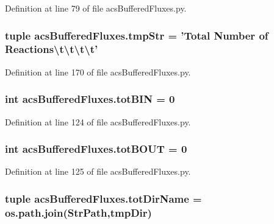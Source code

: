 Definition at line 79 of file acs\-Buffered\-Fluxes.\-py.

\hypertarget{a00098_a5b34c38ff1251831412c297823a2a945}{
\subsubsection[{tmp\-Str}]{\setlength{\rightskip}{0pt plus 5cm}tuple acs\-Buffered\-Fluxes.\-tmp\-Str = 'Total Number of Reactions\textbackslash{}t\textbackslash{}t\textbackslash{}t\textbackslash{}t'}}\label{a00098_a5b34c38ff1251831412c297823a2a945}


Definition at line 170 of file acs\-Buffered\-Fluxes.\-py.

\hypertarget{a00098_ae057f24c5c495bb01544251db7e74ad9}{
\subsubsection[{tot\-B\-I\-N}]{\setlength{\rightskip}{0pt plus 5cm}int acs\-Buffered\-Fluxes.\-tot\-B\-I\-N = 0}}\label{a00098_ae057f24c5c495bb01544251db7e74ad9}


Definition at line 124 of file acs\-Buffered\-Fluxes.\-py.

\hypertarget{a00098_a3da6f0cfe81256d19a801c63ccbe0c96}{
\subsubsection[{tot\-B\-O\-U\-T}]{\setlength{\rightskip}{0pt plus 5cm}int acs\-Buffered\-Fluxes.\-tot\-B\-O\-U\-T = 0}}\label{a00098_a3da6f0cfe81256d19a801c63ccbe0c96}


Definition at line 125 of file acs\-Buffered\-Fluxes.\-py.

\hypertarget{a00098_a7883e37b9556e49968e7a7dd08893bfb}{
\subsubsection[{tot\-Dir\-Name}]{\setlength{\rightskip}{0pt plus 5cm}tuple acs\-Buffered\-Fluxes.\-tot\-Dir\-Name = os.\-path.\-join(Str\-Path,tmp\-Dir)}}\label{a00098_a7883e37b9556e49968e7a7dd08893bfb}


